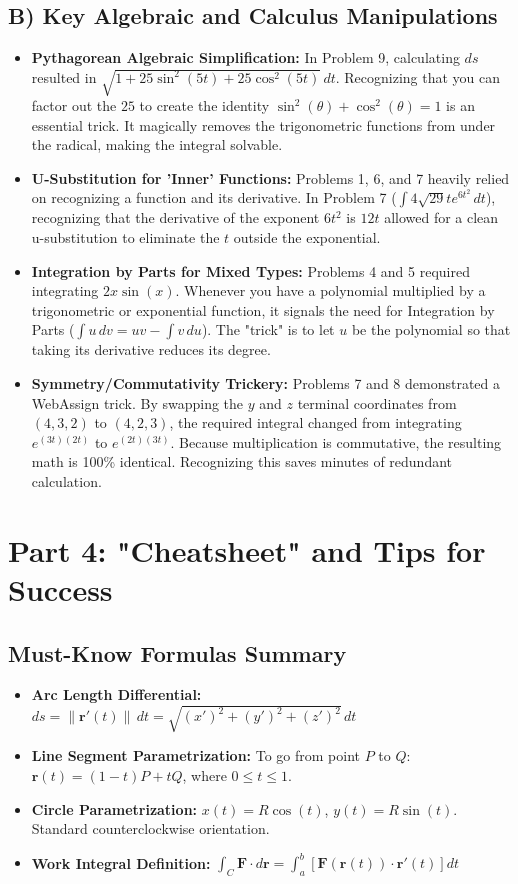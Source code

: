 \documentclass{article}
\begin{document}
\subsection{B) Key Algebraic and Calculus Manipulations}
\begin{itemize}
    \item \textbf{Pythagorean Algebraic Simplification:} In Problem 9, calculating $ds$ resulted in $\sqrt{1 + 25\sin^2(5t) + 25\cos^2(5t)} \, dt$. Recognizing that you can factor out the $25$ to create the identity $\sin^2(\theta) + \cos^2(\theta) = 1$ is an essential trick. It magically removes the trigonometric functions from under the radical, making the integral solvable.
    \item \textbf{U-Substitution for 'Inner' Functions:} Problems 1, 6, and 7 heavily relied on recognizing a function and its derivative. In Problem 7 ($\int 4\sqrt{29} t e^{6t^2} \, dt$), recognizing that the derivative of the exponent $6t^2$ is $12t$ allowed for a clean u-substitution to eliminate the $t$ outside the exponential.
    \item \textbf{Integration by Parts for Mixed Types:} Problems 4 and 5 required integrating $2x\sin(x)$. Whenever you have a polynomial multiplied by a trigonometric or exponential function, it signals the need for Integration by Parts ($\int u \, dv = uv - \int v \, du$). The "trick" is to let $u$ be the polynomial so that taking its derivative reduces its degree.
    \item \textbf{Symmetry/Commutativity Trickery:} Problems 7 and 8 demonstrated a WebAssign trick. By swapping the $y$ and $z$ terminal coordinates from $(4,3,2)$ to $(4,2,3)$, the required integral changed from integrating $e^{(3t)(2t)}$ to $e^{(2t)(3t)}$. Because multiplication is commutative, the resulting math is 100\% identical. Recognizing this saves minutes of redundant calculation.
\end{itemize}

\newpage

\section{Part 4: "Cheatsheet" and Tips for Success}

\subsection{Must-Know Formulas Summary}
\begin{itemize}
    \item \textbf{Arc Length Differential:} $ds = \|\mathbf{r}'(t)\| \, dt = \sqrt{(x')^2 + (y')^2 + (z')^2} \, dt$
    \item \textbf{Line Segment Parametrization:} To go from point $P$ to $Q$: $\mathbf{r}(t) = (1-t)P + tQ$, where $0 \leq t \leq 1$.
    \item \textbf{Circle Parametrization:} $x(t) = R\cos(t)$, $y(t) = R\sin(t)$. Standard counterclockwise orientation.
    \item \textbf{Work Integral Definition:} $\int_C \mathbf{F} \cdot d\mathbf{r} = \int_a^b \left[ \mathbf{F}(\mathbf{r}(t)) \cdot \mathbf{r}'(t) \right] dt$
\end{itemize}
\end{document}
